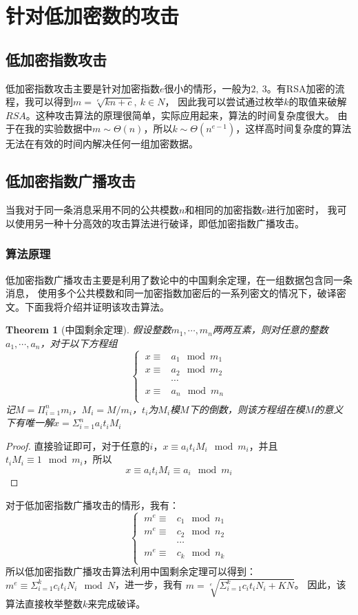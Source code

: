 \documentclass{ctexart}
\newtheorem{theorem}{Theorem}
\begin{document}
\section{针对低加密数的攻击}
\subsection{低加密指数攻击}
低加密指数攻击主要是针对加密指数$e$很小的情形，一般为$2,\ 3$。有RSA加密的流程，我可以得到$m=\sqrt[e]{kn+c},\ k\in N$，
因此我可以尝试通过枚举$k$的取值来破解$RSA$。这种攻击算法的原理很简单，实际应用起来，算法的时间复杂度很大。
由于在我的实验数据中$m\sim \Theta(n)$，所以$k\sim \Theta(n^{e-1})$，这样高时间复杂度的算法无法在有效的时间内解决任何一组加密数据。
\subsection{低加密指数广播攻击}
当我对于同一条消息采用不同的公共模数$n$和相同的加密指数$e$进行加密时，
我可以使用另一种十分高效的攻击算法进行破译，即低加密指数广播攻击。
\subsubsection{算法原理}
低加密指数广播攻击主要是利用了数论中的中国剩余定理，在一组数据包含同一条消息，
使用多个公共模数和同一加密指数加密后的一系列密文的情况下，破译密文。下面我将介绍并证明该攻击算法。
\begin{theorem}[中国剩余定理]
    假设整数$m_1,\cdots,m_n$两两互素，则对任意的整数$a_1,\cdots,a_n$，对于以下方程组
    \begin{equation*}
        \begin{cases}
        \ x\equiv& a_1 \mod m_1\\
        \ x\equiv& a_2  \mod m_2 \\
        &\cdots\\
        \ x\equiv& a_n \mod m_n  \\
        \end{cases} 
    \end{equation*}
    记$M=\Pi_{i=1}^nm_i$，$M_i=M/m_i$，$t_i$为$M_i$模$M$下的倒数，则该方程组在模$M$的意义下有唯一解$x=\Sigma_{i=1}^na_it_iM_i$
\end{theorem}
\begin{proof}
    直接验证即可，对于任意的$i$，$x\equiv a_it_iM_i\mod m_i$，并且$t_iM_i\equiv 1 \mod m_i$，所以
    $$
    x\equiv a_it_iM_i\equiv a_i  \mod m_i
    $$
\end{proof}
对于低加密指数广播攻击的情形，我有：
\begin{equation*}
    \begin{cases}
    \ m^e\equiv& c_1 \mod n_1\\
    \ m^e\equiv& c_2  \mod n_2 \\
    &\cdots\\
    \ m^e\equiv& c_k \mod n_k  \\
    \end{cases} 
\end{equation*}
所以低加密指数广播攻击算法利用中国剩余定理可以得到：
$m^e\equiv\Sigma_{i=1}^kc_it_iN_i\mod N$，进一步，我有
$m=\sqrt[e]{\Sigma_{i=1}^kc_it_iN_i + KN}$。
因此，该算法直接枚举整数$k$来完成破译。
\end{document}

